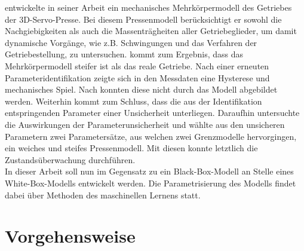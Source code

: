 \cite{Rakowitsch.2018} entwickelte in seiner Arbeit ein mechanisches Mehrkörpermodell des Getriebes der 3D-Servo-Presse. Bei diesem Pressenmodell berücksichtigt er sowohl die Nachgiebigkeiten als auch die Massenträgheiten aller Getriebeglieder, um damit dynamische Vorgänge, wie z.B. Schwingungen und das Verfahren der Getriebestellung, zu untersuchen. \cite{Rakowitsch.2018} kommt zum Ergebnis, dass das Mehrkörpermodell steifer ist als das reale Getriebe. Nach einer erneuten Parameteridentifikation zeigte sich in den Messdaten eine Hysterese und mechanisches Spiel. Nach \cite{Rakowitsch.2018} konnten diese nicht durch das Modell abgebildet werden. Weiterhin kommt \cite{Rakowitsch.2018} zum Schluss, dass die aus der Identifikation entspringenden Parameter einer Unsicherheit unterliegen. Daraufhin untersuchte \cite{Rakowitsch.2018} die Auswirkungen der Parameterunsicherheit und wählte aus den unsicheren Parametern zwei Parametersätze, aus welchen zwei Grenzmodelle hervorgingen, ein weiches und steifes Pressenmodell. Mit diesen konnte \cite{Rakowitsch.2018} letztlich die Zustandsüberwachung durchführen. \\

In dieser Arbeit soll nun im Gegensatz zu \cite{Rakowitsch.2018} ein Black-Box-Modell an Stelle eines White-Box-Modells entwickelt werden. Die Parametrisierung des Modells findet dabei über Methoden des maschinellen Lernens statt. 


\section{Vorgehensweise}








   





